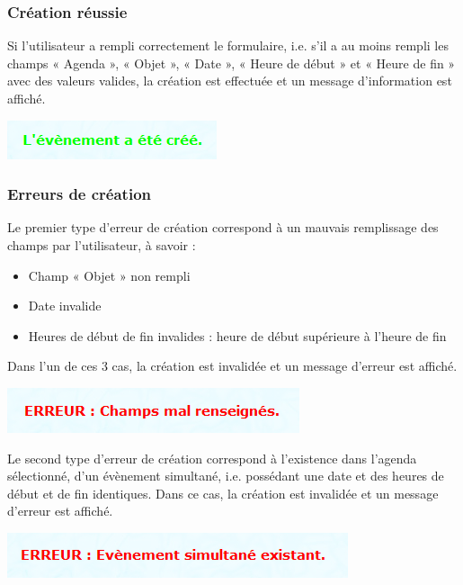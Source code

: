 \documentclass[12pt , a4paper]{article}
\begin{document}
\subsubsection{Création réussie}
\noindent Si l’utilisateur a rempli correctement le formulaire, i.e. s’il a au moins rempli les champs
« Agenda », « Objet », « Date », « Heure de début » et « Heure de fin » avec des valeurs valides,
la création est effectuée et un message d’information est affiché.
\begin{center}
  \includegraphics[scale=0.6]{./images/creation_event2.png}
\end{center}



\subsubsection{Erreurs de création}
\noindent Le premier type d’erreur de création correspond à un mauvais remplissage des champs par
l’utilisateur, à savoir :

\begin{itemize}
\item   Champ « Objet » non rempli
\item Date invalide
\item Heures de début de fin invalides : heure de début supérieure à l'heure de fin
\end{itemize}

\noindent Dans l’un de ces 3 cas, la création est invalidée et un message d’erreur est affiché.

\begin{center}
  \includegraphics[scale=0.6]{./images/creation_event3.png}
\end{center}



\noindent Le second type d’erreur de création correspond à l’existence dans l’agenda sélectionné, d’un
évènement simultané, i.e. possédant une date et des heures de début et de fin identiques. Dans
ce cas, la création est invalidée et un message d’erreur est affiché.

\begin{center}
  \includegraphics[scale=0.6]{./images/creation_event4.png}
\end{center}
\end{document}
